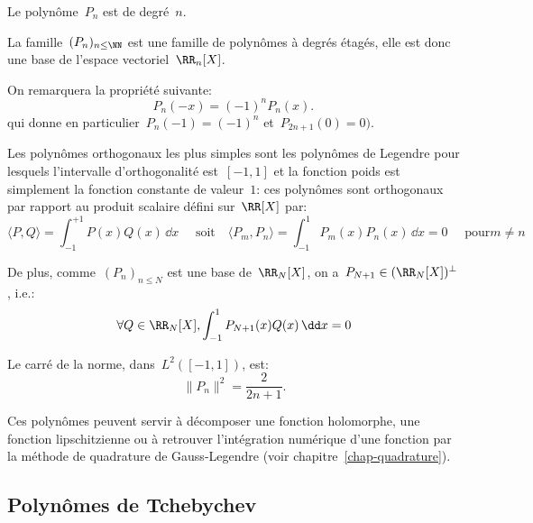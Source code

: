 \medskip
Le polynôme~$P_n$ est de degré~$n$.

La famille~$(P_n)_{n\leq \NN}$ est une famille de polynômes à degrés étagés, 
elle est donc une base de l'espace vectoriel~$\RR_n[X]$.

\medskip
On remarquera la propriété suivante:
\begin{equation}
  P_n(-x)=(-1)^nP_n(x).\,
\end{equation}
qui donne en particulier~$P_n( - 1) = ( - 1)^n$ et~$P_{2n + 1}(0) = 0)$.

\medskip
Les polynômes orthogonaux les plus simples sont les polynômes de Legendre 
pour lesquels l'intervalle d'orthogonalité est~$[-1, 1]$ et la fonction poids est simplement la fonction 
constante de valeur~$1$: 
ces polynômes sont orthogonaux par rapport au produit scalaire défini sur~$\RR[X]$ par:
\begin{equation}
  \langle P,Q\rangle= \int_{-1}^{+1} P(x) Q(x)\, \dd x
  \quad \text{ soit} \quad 
  \langle P_m,P_n\rangle= \int_{-1}^{1} P_m(x)P_n(x)\,\dd x = 0\quad \text{ pour} m \ne n 
\end{equation}

\medskip
De plus, comme~$(P_n)_{n\leq N}$ est une base de~$\RR_N[X]$, 
on a~$P_{N+1} \in (\RR_N[X])^\bot$, i.e.:
\begin{equation}
  \forall Q \in \RR_N[X], \int_{-1}^{1} P_{N+1}(x)Q(x)\,\dd x = 0
\end{equation}

\medskip
Le carré de la norme, dans~$L^2([-1,1])$, est:
\begin{equation}
  \|P_n\|^2=\frac{2}{2n+1}. 
\end{equation}


\medskip
Ces polynômes peuvent servir à décomposer une fonction holomorphe,
une fonction lipschitzienne ou à retrouver l'intégration numérique d'une fonction par
la méthode de quadrature de Gauss-Legendre (voir chapitre~\ref{chap-quadrature}).




\medskip
\subsection{Polynômes de Tchebychev}

